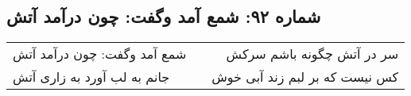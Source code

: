 \begin{center}
\section*{شماره ۹۲: شمع آمد وگفت: چون درآمد آتش}
\label{sec:092}
\begin{longtable}{l p{0.5cm} r}
شمع آمد وگفت: چون درآمد آتش
&&
سر در آتش چگونه باشم سرکش
\\
جانم به لب آورد به زاری آتش
&&
کس نیست که بر لبم زند آبی خوش
\\
\end{longtable}
\end{center}
